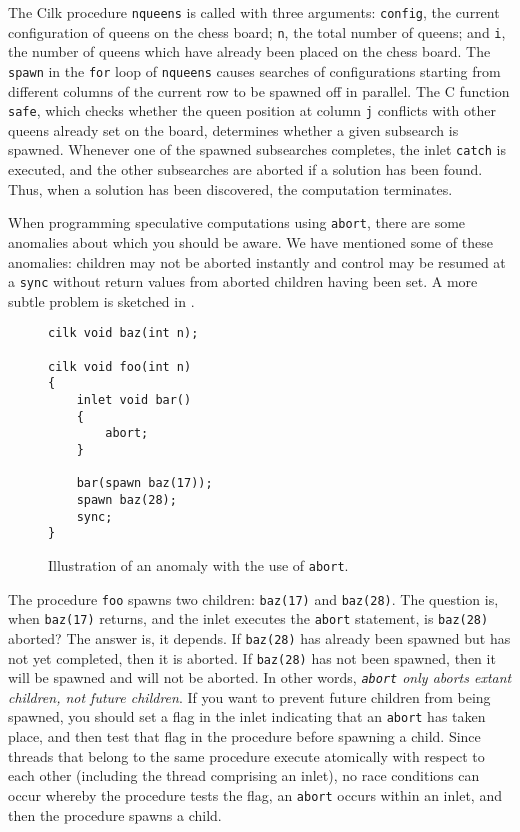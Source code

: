 The Cilk procedure \texttt{nqueens} is called with three arguments:
\texttt{config}, the current configuration of queens on the chess
board; \texttt{n}, the total number of queens; and \texttt{i}, the
number of queens which have already been placed on the chess board.
The \texttt{spawn} in the \texttt{for} loop of \texttt{nqueens} causes
searches of configurations starting from different columns of the
current row to be spawned off in parallel.  The C function
\texttt{safe}, which checks whether the queen position at column
\texttt{j} conflicts with other queens already set on the board,
determines whether a given subsearch is spawned.  Whenever one of the
spawned subsearches completes, the inlet \texttt{catch} is executed,
and the other subsearches are aborted if a solution has been found.
Thus, when a solution has been discovered, the computation terminates.

When programming speculative computations using \texttt{abort}, there
are some anomalies about which you should be aware.  We have mentioned
some of these anomalies: children may not be aborted instantly and
control may be resumed at a \texttt{sync} without return values from
aborted children having been set.  A more subtle problem is sketched
in .

\begin{figure}[t]
\begin{center}
\begin{minipage}{.5\linewidth}
\small
\begin{verbatim}
cilk void baz(int n);

cilk void foo(int n)
{  
    inlet void bar()
    {
        abort;
    }
  
    bar(spawn baz(17));
    spawn baz(28);
    sync;
}
\end{verbatim}
\end{minipage}
\end{center}
\caption{\small Illustration of an anomaly with the use of \texttt{abort}.}
\label{fig:abort-anomaly}
\end{figure}

The procedure \texttt{foo} spawns two children: \texttt{baz(17)} and
\texttt{baz(28)}.  The question is, when \texttt{baz(17)} returns, and
the inlet executes the \texttt{abort} statement, is \texttt{baz(28)}
aborted?  The answer is, it depends.  If \texttt{baz(28)} has already
been spawned but has not yet completed, then it is aborted.  If
\texttt{baz(28)} has not been spawned, then it will be spawned and
will not be aborted.  In other words, \emph{{\tt abort} only aborts
extant children, not future children}.  If you want to prevent future
children from being spawned, you should set a flag in the inlet
indicating that an \texttt{abort} has taken place, and then test that
flag in the procedure before spawning a child.  Since threads that
belong to the same procedure execute atomically with respect to each
other (including the thread comprising an inlet), no race conditions
can occur whereby the procedure tests the flag, an \texttt{abort}
occurs within an inlet, and then the procedure spawns a
child.

